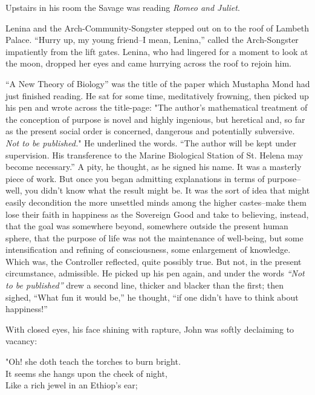 \documentclass[12pt]{report}
\begin{document}
Upstairs in his room the Savage was reading \emph{Romeo and Juliet}.

Lenina and the Arch-Community-Songster stepped out on to the roof of
Lambeth Palace. ``Hurry up, my young friend--I mean, Lenina,'' called
the Arch-Songster impatiently from the lift gates. Lenina, who had
lingered for a moment to look at the moon, dropped her eyes and came
hurrying across the roof to rejoin him.

``A New Theory of Biology'' was the title of the paper which Mustapha
Mond had just finished reading. He sat for some time, meditatively
frowning, then picked up his pen and wrote across the title-page: "The
author's mathematical treatment of the conception of purpose is novel
and highly ingenious, but heretical and, so far as the present social
order is concerned, dangerous and potentially subversive. \emph{Not to
be published.}" He underlined the words. ``The author will be kept under
supervision. His transference to the Marine Biological Station of St.
Helena may become necessary.'' A pity, he thought, as he signed his
name. It was a masterly piece of work. But once you began admitting
explanations in terms of purpose--well, you didn't know what the result
might be. It was the sort of idea that might easily decondition the more
unsettled minds among the higher castes--make them lose their faith in
happiness as the Sovereign Good and take to believing, instead, that the
goal was somewhere beyond, somewhere outside the present human sphere,
that the purpose of life was not the maintenance of well-being, but some
intensification and refining of consciousness, some enlargement of
knowledge. Which was, the Controller reflected, quite possibly true. But
not, in the present circumstance, admissible. He picked up his pen
again, and under the words \emph{``Not to be published''} drew a second
line, thicker and blacker than the first; then sighed, ``What fun it
would be,'' he thought, ``if one didn't have to think about happiness!''

With closed eyes, his face shining with rapture, John was softly
declaiming to vacancy:

\emph{}

"Oh! she doth teach the torches to burn bright.\\

It seems she hangs upon the cheek of night,\\

Like a rich jewel in an Ethiop's ear;\\
\end{document}
